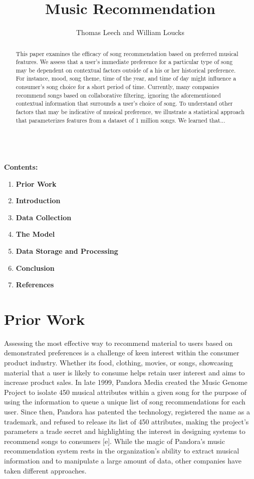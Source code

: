 \documentclass{amsart}
\theoremstyle{plain}
\theoremstyle{definition}
\begin{document}
   	
   	\title{ Music Recommendation }
   	\author{ Thomas Leech and William Loucks }
   	
   	\begin{abstract}
   		This paper examines the efficacy of song recommendation based on preferred musical features. We assess that a user's immediate preference for a particular type of song may be dependent on contextual factors outside of a his or her historical preference. For instance, mood, song theme, time of the year, and time of day might influence a consumer's song choice for a short period of time. Currently, many companies recommend songs based on collaborative filtering, ignoring the aforementioned contextual information that surrounds a user's choice of song. To understand other factors that may be indicative of musical preference, we illustrate a statistical approach that parameterizes features from a dataset of 1 million songs. We learned that...
   	\end{abstract}
   
   	\maketitle
   	
   	\noindent \hrulefill \ \\
	\noindent \textbf{Contents:}
   	\begin{enumerate}
   		\item \textbf{Prior Work}
   		\item \textbf{Introduction}
   		\item \textbf{Data Collection}
   		\item \textbf{The Model}
   		\item \textbf{Data Storage and Processing}
   		\item \textbf{Conclusion}
   		\item \textbf{References}
   	\end{enumerate}
   \noindent \hrulefill

   	\section{Prior Work}
   	
   	Assessing the most effective way to recommend material to users based on demonstrated preferences is a challenge of keen interest within the consumer product industry. Whether its food, clothing, movies, or songs, showcasing material that a user is likely to consume helps retain user interest and aims to increase product sales. In late 1999, Pandora Media created the Music Genome Project to isolate 450 musical attributes within a given song for the purpose of using the information to queue a unique list of song recommendations for each user. Since then, Pandora has patented the technology, registered the name as a trademark, and refused to release its list of 450 attributes, making the project's parameters a trade secret and highlighting the interest in designing systems to recommend songs to consumers [e]. While the magic of Pandora's music recommendation system rests in the organization's ability to extract musical information and to manipulate a large amount of data, other companies have taken different approaches.
   	
\end{document}
